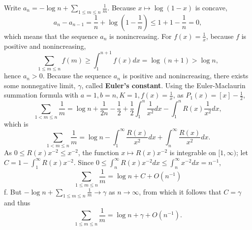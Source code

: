 \documentclass{amsart}
\begin{document}
Write $a_n  = - \log n+ \sum_{1 \leq m \leq n} \frac{1}{m}$. Because $x \mapsto \log(1-x)$ is concave,
\[
a_n - a_{n-1} = \frac{1}{n} + \log\left(1-\frac{1}{n} \right) \leq 1 + 1 - \frac{1}{n}=0,
\] 
which means that the sequence $a_n$ is nonincreasing. For $f(x)=\frac{1}{x}$, because
$f$ is positive and nonincreasing,
\[
\sum_{1 \leq m \leq n} f(m) \geq \int_1^{n+1} f(x) dx = \log(n+1) > \log n,
\]
hence $a_n>0$. Because the sequence $a_n$ is positive and nonincreasing, there exists some nonnegative limit,
$\gamma$, called \textbf{Euler's constant}. 
Using the Euler-Maclaurin summation formula with $a=1, b=n, K=1, f(x)=\frac{1}{x}$, as $P_1(x) = [x]-\frac{1}{2}$,
\[
\sum_{1 < m \leq n} \frac{1}{m} = \log n + \frac{1}{2n} - \frac{1}{2} + \frac{1}{2} \int_1^n \frac{1}{x^2} dx - \int_1^n R(x) \frac{1}{x^2} dx,
\]
which is
\[
\sum_{1<m \leq n} \frac{1}{m} = \log n - \int_1^\infty \frac{R(x)}{x^2} dx + \int_n^\infty \frac{R(x)}{x^2} dx.
\]
As $0 \leq R(x) x^{-2} \leq x^{-2}$, the function $x \mapsto R(x)x^{-2}$ is integrable
on $[1,\infty)$; let $C=1-\int_1^\infty R(x)x^{-2}$.
Since $0 \leq \int_n^\infty R(x)x^{-2} dx \leq \int_n^\infty x^{-2} dx = n^{-1}$, 
\[
\sum_{1 \leq m \leq n} \frac{1}{m} = \log n + C + O(n^{-1})
\]
f. But $-\log n + \sum_{1 \leq m \leq n} \frac{1}{m} \to \gamma$ as $n \to \infty$, from which it follows that
$C=\gamma$ and thus
\[
\sum_{1 \leq m \leq n} \frac{1}{m} = \log n + \gamma + O(n^{-1}).
\]
\end{document}

